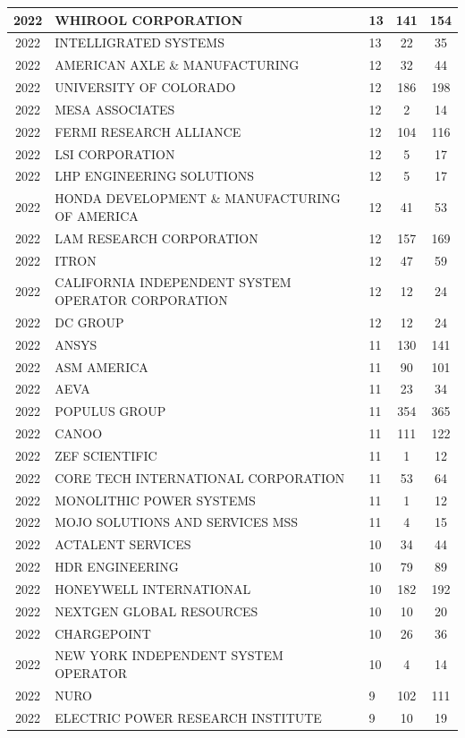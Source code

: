 \documentclass{article}%
\begin{document}
\begin{longtable}{c|p{20em}|p{5em}|c|c}
\hline%
2022&WHIROOL CORPORATION&13&141&154\\%
\hline%
2022&INTELLIGRATED SYSTEMS&13&22&35\\%
\hline%
2022&AMERICAN AXLE \& MANUFACTURING&12&32&44\\%
\hline%
2022&UNIVERSITY OF COLORADO&12&186&198\\%
\hline%
2022&MESA ASSOCIATES&12&2&14\\%
\hline%
2022&FERMI RESEARCH ALLIANCE&12&104&116\\%
\hline%
2022&LSI CORPORATION&12&5&17\\%
\hline%
2022&LHP ENGINEERING SOLUTIONS&12&5&17\\%
\hline%
2022&HONDA DEVELOPMENT \& MANUFACTURING OF AMERICA&12&41&53\\%
\hline%
2022&LAM RESEARCH CORPORATION&12&157&169\\%
\hline%
2022&ITRON&12&47&59\\%
\hline%
2022&CALIFORNIA INDEPENDENT SYSTEM OPERATOR CORPORATION&12&12&24\\%
\hline%
2022&DC GROUP&12&12&24\\%
\hline%
2022&ANSYS&11&130&141\\%
\hline%
2022&ASM AMERICA&11&90&101\\%
\hline%
2022&AEVA&11&23&34\\%
\hline%
2022&POPULUS GROUP&11&354&365\\%
\hline%
2022&CANOO&11&111&122\\%
\hline%
2022&ZEF SCIENTIFIC&11&1&12\\%
\hline%
2022&CORE TECH INTERNATIONAL CORPORATION&11&53&64\\%
\hline%
2022&MONOLITHIC POWER SYSTEMS&11&1&12\\%
\hline%
2022&MOJO SOLUTIONS AND SERVICES MSS&11&4&15\\%
\hline%
2022&ACTALENT SERVICES&10&34&44\\%
\hline%
2022&HDR ENGINEERING&10&79&89\\%
\hline%
2022&HONEYWELL INTERNATIONAL&10&182&192\\%
\hline%
2022&NEXTGEN GLOBAL RESOURCES&10&10&20\\%
\hline%
2022&CHARGEPOINT&10&26&36\\%
\hline%
2022&NEW YORK INDEPENDENT SYSTEM OPERATOR&10&4&14\\%
\hline%
2022&NURO&9&102&111\\%
\hline%
2022&ELECTRIC POWER RESEARCH INSTITUTE&9&10&19\\%
\hline%

\end{longtable}
\end{document}
